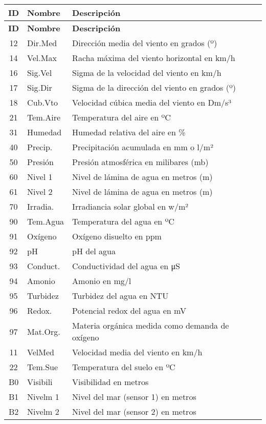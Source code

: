 \begin{longtable}{|c|l|p{8.5cm}|}
	\hline
	\textbf{ID} & \textbf{Nombre} & \textbf{Descripción} \\
	\hline
	\endfirsthead
	\hline
	\textbf{ID} & \textbf{Nombre} & \textbf{Descripción} \\
	\hline
	\endhead
	\hline
	\endfoot
	
	12 & Dir.Med & Dirección media del viento en grados (º) \\
	14 & Vel.Max & Racha máxima del viento horizontal en km/h \\
	16 & Sig.Vel & Sigma de la velocidad del viento en km/h \\
	17 & Sig.Dir & Sigma de la dirección del viento en grados (º) \\
	18 & Cub.Vto & Velocidad cúbica media del viento en Dm/s³ \\
	21 & Tem.Aire & Temperatura del aire en ºC \\
	31 & Humedad & Humedad relativa del aire en \% \\
	40 & Precip. & Precipitación acumulada en mm o l/m² \\
	50 & Presión & Presión atmosférica en milibares (mb) \\
	60 & Nivel 1 & Nivel de lámina de agua en metros (m) \\
	61 & Nivel 2 & Nivel de lámina de agua en metros (m) \\
	70 & Irradia. & Irradiancia solar global en w/m² \\
	90 & Tem.Agua & Temperatura del agua en ºC \\
	91 & Oxígeno & Oxígeno disuelto en ppm \\
	92 & pH & pH del agua \\
	93 & Conduct. & Conductividad del agua en μS \\
	94 & Amonio & Amonio en mg/l \\
	95 & Turbidez & Turbidez del agua en NTU \\
	96 & Redox. & Potencial redox del agua en mV \\
	97 & Mat.Org. & Materia orgánica medida como demanda de oxígeno \\
	11 & VelMed & Velocidad media del viento en km/h \\
	22 & Tem.Sue & Temperatura del suelo en ºC \\
	B0 & Visibili & Visibilidad en metros \\
	B1 & Nivelm 1 & Nivel del mar (sensor 1) en metros \\
	B2 & Nivelm 2 & Nivel del mar (sensor 2) en metros \\

\end{longtable}

